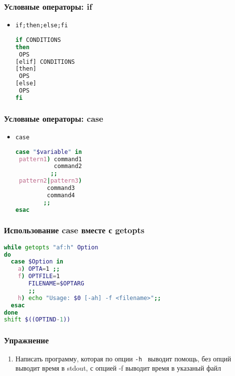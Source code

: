 \begin{frame}[fragile]
\frametitle{Условные операторы: if}
\begin{itemize}
\item {\tt if;then;else;fi}
\begin{lstlisting}[language=sh,frame=single]
if CONDITIONS
then 
 OPS
[elif] CONDITIONS
[then]
 OPS
[else]
 OPS
fi
\end{lstlisting}
\end{itemize}
\end{frame}

\begin{frame}[fragile]
\frametitle{Условные операторы: case}
\begin{itemize}
\item {\tt case}
\begin{lstlisting}[language=sh,frame=single]
case "$variable" in 
 pattern1) command1
           command2
          ;;
 pattern2|pattern3)
         command3
         command4
        ;;
esac
\end{lstlisting}
\end{itemize}
\end{frame}

\begin{frame}[fragile]
\frametitle{Использование case вместе с getopts}
\begin{lstlisting}[language=sh,frame=single]
while getopts "af:h" Option
do
  case $Option in 
    a) OPTA=1 ;;
    f) OPTFILE=1
       FILENAME=$OPTARG
       ;;
    h) echo "Usage: $0 [-ah] -f <filename>";;
  esac  
done
shift $((OPTIND-1))
\end{lstlisting}
\end{frame}

\begin{frame}[fragile]
\frametitle{Упражнение}
\begin{enumerate}
\item Написать программу, которая по опции {\tt -h } выводит помощь, без опций выводит время в stdout,
с опцией -f выводит время в указаный файл
\end{enumerate}
\end{frame}
